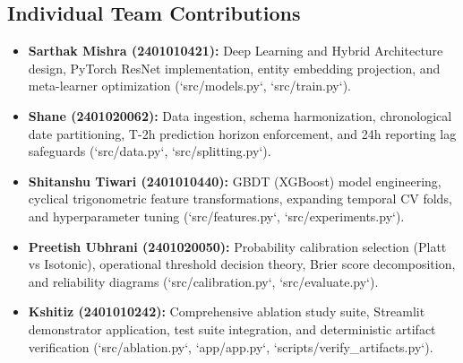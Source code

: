 \documentclass[conference]{IEEEtran}
\begin{document}
\subsection{Individual Team Contributions}
\begin{itemize}
    \item \textbf{Sarthak Mishra (2401010421):} Deep Learning and Hybrid Architecture design, PyTorch ResNet implementation, entity embedding projection, and meta-learner optimization (`src/models.py`, `src/train.py`).
    \item \textbf{Shane (2401020062):} Data ingestion, schema harmonization, chronological date partitioning, T-2h prediction horizon enforcement, and 24h reporting lag safeguards (`src/data.py`, `src/splitting.py`).
    \item \textbf{Shitanshu Tiwari (2401010440):} GBDT (XGBoost) model engineering, cyclical trigonometric feature transformations, expanding temporal CV folds, and hyperparameter tuning (`src/features.py`, `src/experiments.py`).
    \item \textbf{Preetish Ubhrani (2401020050):} Probability calibration selection (Platt vs Isotonic), operational threshold decision theory, Brier score decomposition, and reliability diagrams (`src/calibration.py`, `src/evaluate.py`).
    \item \textbf{Kshitiz (2401010242):} Comprehensive ablation study suite, Streamlit demonstrator application, test suite integration, and deterministic artifact verification (`src/ablation.py`, `app/app.py`, `scripts/verify_artifacts.py`).
\end{itemize}



\end{document}
